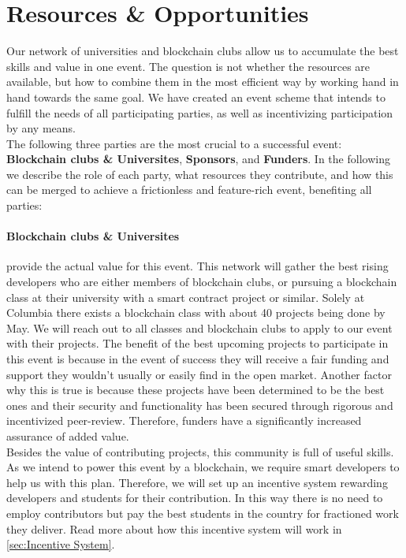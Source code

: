 \section{Resources \& Opportunities}
Our network of universities and blockchain clubs allow us to accumulate the best skills and value in one event. The question is not whether the resources are available, but how to combine them in the most efficient way by working hand in hand towards the same goal. We have created an event scheme that intends to fulfill the needs of all participating parties, as well as incentivizing participation by any means. \\
The following three parties are the most crucial to a successful event: \textbf{Blockchain clubs \& Universites}, \textbf{Sponsors}, and \textbf{Funders}. In the following we describe the role of each party, what resources they contribute, and how this can be merged to achieve a frictionless and feature-rich event, benefiting all parties:
%
%
\paragraph{Blockchain clubs \& Universites} provide the actual value for this event. This network will gather the best rising developers who are either members of blockchain clubs, or pursuing a blockchain class at their university with a smart contract project or similar. Solely at Columbia there exists a blockchain class with about 40 projects being done by May. We will reach out to all classes and blockchain clubs to apply to our event with their projects. The benefit of the best upcoming projects to participate in this event is because in the event of success they will receive a fair funding and support they wouldn't usually or easily find in the open market. Another factor why this is true is because these projects have been determined to be the best ones and their security and functionality has been secured through rigorous and incentivized peer-review. Therefore, funders have a significantly increased assurance of added value.\\
Besides the value of contributing projects, this community is full of useful skills. As we intend to power this event by a blockchain, we require smart developers to help us with this plan. Therefore, we will set up an incentive system rewarding developers and students for their contribution. In this way there is no need to employ contributors but pay the best students in the country for fractioned work they deliver. Read more about how this incentive system will work in \autoref{sec:Incentive System}.

